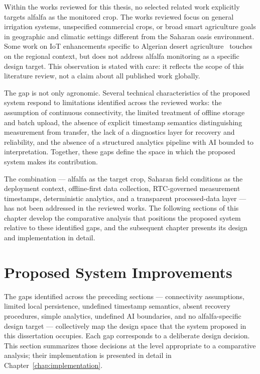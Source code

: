 Within the works reviewed for this thesis, no selected related work
explicitly targets alfalfa as the monitored crop. The works reviewed focus on
general irrigation systems, unspecified commercial crops, or broad smart
agriculture goals in geographic and climatic settings different from the
Saharan oasis environment. Some work on IoT enhancements specific to Algerian
desert agriculture~\cite{iot_enhancements_algerian_desert_agriculture} touches
on the regional context,
but does not address alfalfa monitoring as a specific design target. This
observation is stated with care: it reflects the scope of this literature
review, not a claim about all published work globally.

The gap is not only agronomic. Several technical characteristics of the
proposed system respond to limitations identified across the reviewed works:
the assumption of continuous connectivity, the limited treatment of offline
storage and batch upload, the absence of explicit timestamp semantics
distinguishing measurement from transfer, the lack of a diagnostics layer for
recovery and reliability, and the absence of a structured analytics pipeline
with AI bounded to interpretation. Together, these gaps define the space in
which the proposed system makes its contribution.

The combination --- alfalfa as the target crop, Saharan field conditions as
the deployment context, offline-first data collection, RTC-governed measurement
timestamps, deterministic analytics, and a transparent processed-data layer ---
has not been addressed in the reviewed works. The following sections of this
chapter develop the comparative analysis that positions the proposed system
relative to these identified gaps, and the subsequent chapter presents its
design and implementation in detail.

\section{Proposed System Improvements}
\label{sec:proposed-improvements}

The gaps identified across the preceding sections --- connectivity assumptions,
limited local persistence, undefined timestamp semantics, absent recovery
procedures, simple analytics, undefined AI boundaries, and no alfalfa-specific
design target --- collectively map the design space that the system proposed in
this dissertation occupies. Each gap corresponds to a deliberate design
decision. This section summarizes those decisions at the level appropriate to
a comparative analysis; their implementation is presented in detail in
Chapter~\ref{chap:implementation}.


